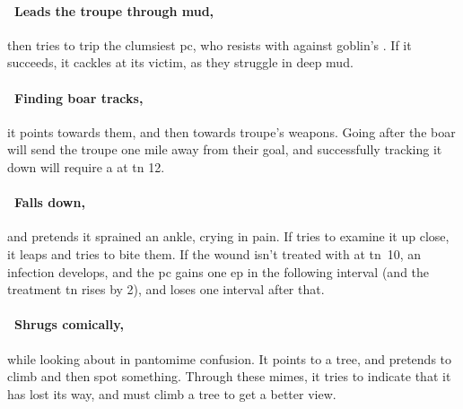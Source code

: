 \documentclass[10pt,twoside]{book}
\begin{document}
\paragraph{\Square~Leads the troupe through mud,}
then tries to trip the clumsiest \gls{pc}, who resists with  against goblin's .
If it succeeds, it cackles at its victim, as they struggle in deep mud.


\boar

\paragraph{\Square~Finding boar tracks,}
it points towards them, and then towards troupe's \glspl{weapon}.
Going after the boar will send the troupe one mile away from their goal, and successfully tracking it down will require a  at \gls{tn} 12.

\paragraph{\Square~Falls down,}
and pretends it sprained an ankle, crying in pain.
If  tries to examine it up close, it leaps and tries to bite them.
If the wound isn't treated with  at \gls{tn}~10, an infection develops, and the \gls{pc} gains one \gls{ep} in the following \gls{interval} (and the treatment \gls{tn} rises by 2), and loses  one \gls{interval} after that.

\paragraph{\Square~Shrugs comically,}
while looking about in pantomime confusion.
It points to a tree, and pretends to climb and then spot something.
Through these mimes, it tries to indicate that it has lost its way, and must climb a tree to get a better view.
\end{document}
